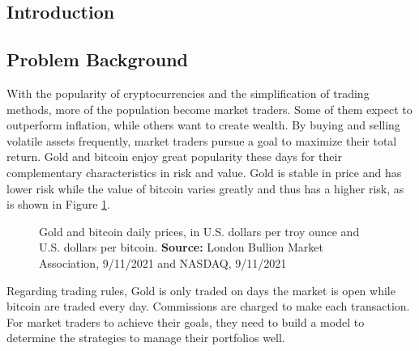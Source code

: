 \documentclass[12pt,a4paper]{article}
\begin{document}
\begin{spacing}{1.2} 



\section{Introduction}
\label{Problem_Statement}

\subsection{Problem Background}
With the popularity of cryptocurrencies and the simplification of trading methods, more of the population become market traders. Some of them expect to outperform inflation, while others want to create wealth. By buying and selling volatile assets frequently, market traders pursue a goal to maximize their total return. Gold and bitcoin enjoy great popularity these days for their complementary characteristics in risk and value. Gold is stable in price and has lower risk while the value of bitcoin varies greatly and thus has a higher risk, as is shown in Figure \ref{figure:prices2in1}.

\begin{figure}[H]
	\caption{Gold and bitcoin daily prices, in U.S. dollars per troy ounce and U.S. dollars per bitcoin. \textbf{Source:} London Bullion Market 
		Association, 9/11/2021 and NASDAQ, 9/11/2021 }
	\label{figure:prices2in1}
\end{figure}

 Regarding trading rules, Gold is only traded on days the market is open while bitcoin are traded every day. Commissions are charged to make each transaction. For market traders to achieve their goals, they need to build a model to determine the strategies to manage their portfolios well.


\end{spacing}
\end{document}

